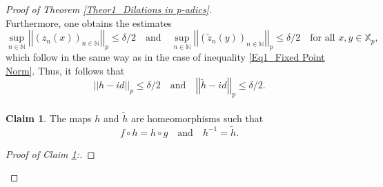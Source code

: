 \documentclass[a4paper, 12pt]{article}
\theoremstyle{definition}
\newtheorem{claim}{Claim}[section]
\begin{document}
\begin{proof}[Proof of Theorem \ref{Theor1_Dilations in p-adics}]
\begin{equation}
		\end{equation}
		Furthermore, one obtains the estimates  
		\begin{equation}\label{Eq1_Theor1_delta Fixed Point} 
			\underset{n \in \mathbb{N} }{\sup}   \left| \left|   \left(  z_{n}(x)   \right)_{n\in \mathbb{N} }  \right|  \right|_{p} \le \delta/2 \quad \text{and} \quad \underset{n \in \mathbb{N} }{\sup}    \left| \left|   \left(  \tilde{z}_{n}(y)   \right)_{n\in \mathbb{N} }  \right|  \right|_{p} \le \delta/2  \quad \text{for all } x,y \in \mathbb{X}_{p},  
		\end{equation}
		which follow in the same way as in the case of inequality \eqref{Eq1_Fixed Point Norm}. 
		Thus, it follows that  
		$$  \left| \left|  h - id  \right|  \right|_{p}   \le   \delta/2 \quad \text{and} \quad  \left| \left|  \tilde{h} - id  \right|  \right|_{p}   \le   \delta/2 .$$
		
		
		
		\paragraph{}
		
		\begin{claim}\label{Claim 1.2}
			The maps $h$ and $\tilde{h}$ are homeomorphisms such that
			\begin{equation}\label{Eq1_Conjugation fg}
				f\circ h   =   h \circ g \quad \text{and} \quad  h^{-1}   =    \tilde{h} .
			\end{equation}
			
			
		\end{claim}
		
		
		\begin{proof}[Proof of Claim \ref{Claim 1.2}:]
			

\end{proof}
\end{proof}
\end{document}
